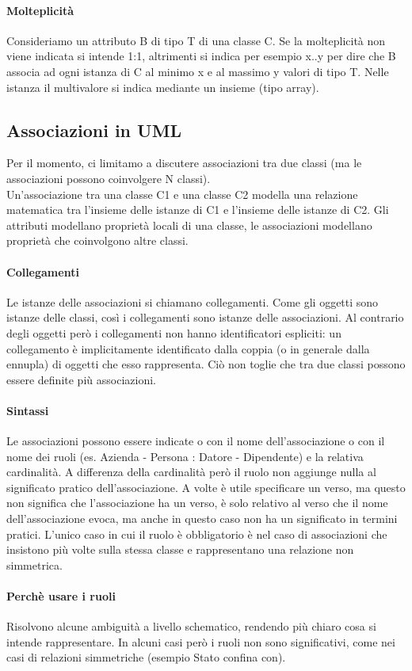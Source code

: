\paragraph*{Molteplicità} Consideriamo un attributo B di tipo T di una classe C.
Se la molteplicità non viene indicata si intende 1:1, altrimenti si indica per
esempio x..y per dire che B associa ad ogni istanza di C al minimo x e al massimo y valori
di tipo T. Nelle istanza il multivalore si indica mediante un insieme (tipo array).
\subsection{Associazioni in UML}
Per il momento, ci limitamo a discutere associazioni tra due classi (ma le associazioni
possono coinvolgere N classi).
\\ Un'associazione tra una classe C1 e una classe C2 modella una relazione matematica
tra l'insieme delle istanze di C1 e l'insieme delle istanze di C2.
Gli attributi modellano proprietà locali di una classe, le associazioni modellano
proprietà che coinvolgono altre classi.
\paragraph*{Collegamenti} Le istanze delle associazioni si chiamano collegamenti.
Come gli oggetti sono istanze delle classi, così i collegamenti sono istanze delle associazioni.
Al contrario degli oggetti però i collegamenti non hanno identificatori espliciti:
un collegamento è implicitamente identificato dalla coppia (o in generale dalla
ennupla) di oggetti che esso rappresenta. Ciò non toglie che tra due classi possono essere definite
più associazioni.
\paragraph*{Sintassi} Le associazioni possono essere indicate o con il nome
dell'associazione o con il nome dei ruoli (es. Azienda - Persona : Datore - Dipendente) e la
relativa cardinalità. A differenza della cardinalità però il ruolo non aggiunge nulla
al significato pratico dell'associazione. 
A volte è utile specificare un verso, ma questo non significa
che l'associazione ha un verso, è solo relativo al verso che il nome dell'associazione
evoca, ma anche in questo caso non ha un significato in termini pratici.
L'unico caso in cui il ruolo è obbligatorio è nel caso di associazioni che insistono più
volte sulla stessa classe e rappresentano una relazione non simmetrica.
\paragraph*{Perchè usare i ruoli} Risolvono alcune ambiguità a livello schematico, rendendo
più chiaro cosa si intende rappresentare. In alcuni casi però i ruoli non sono
significativi, come nei casi di relazioni simmetriche (esempio Stato confina con).
